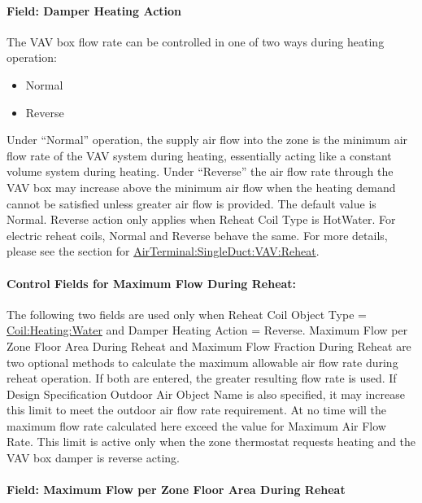 \paragraph{Field: Damper Heating Action}\label{field-damper-heating-action-000}

The VAV box flow rate can be controlled in one of two ways during heating operation:

\begin{itemize}
\item
  Normal
\item
  Reverse
\end{itemize}

Under ``Normal'' operation, the supply air flow into the zone is the minimum air flow rate of the VAV system during heating, essentially acting like a constant volume system during heating. Under ``Reverse'' the air flow rate through the VAV box may increase above the minimum air flow when the heating demand cannot be satisfied unless greater air flow is provided. The default value is Normal. Reverse action only applies when Reheat Coil Type is HotWater. For electric reheat coils, Normal and Reverse behave the same. For more details, please see the section for \hyperref[airterminalsingleductvavreheat]{AirTerminal:SingleDuct:VAV:Reheat}.

\paragraph{Control Fields for Maximum Flow During Reheat:}\label{control-fields-for-maximum-flow-during-reheat-000}

The following two fields are used only when Reheat Coil Object Type = \hyperref[coilheatingwater]{Coil:Heating:Water} and Damper Heating Action = Reverse. Maximum Flow per Zone Floor Area During Reheat and Maximum Flow Fraction During Reheat are two optional methods to calculate the maximum allowable air flow rate during reheat operation. If both are entered, the greater resulting flow rate is used. If Design Specification Outdoor Air Object Name is also specified, it may increase this limit to meet the outdoor air flow rate requirement. At no time will the maximum flow rate calculated here exceed the value for Maximum Air Flow Rate. This limit is active only when the zone thermostat requests heating and the VAV box damper is reverse acting.

\paragraph{Field: Maximum Flow per Zone Floor Area During Reheat}\label{field-maximum-flow-per-zone-floor-area-during-reheat-000}


